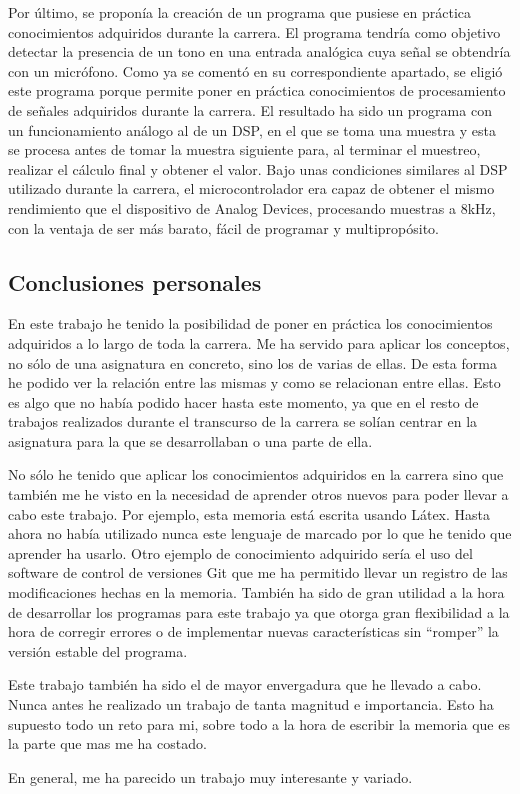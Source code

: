 Por último, se proponía la creación de un programa que pusiese en práctica conocimientos adquiridos durante la carrera. El programa tendría como objetivo detectar la presencia de un tono en una entrada analógica cuya señal se obtendría con un micrófono. Como ya se comentó en su correspondiente apartado, se eligió este programa porque permite poner en práctica conocimientos de procesamiento de señales adquiridos durante la carrera. El resultado ha sido un programa con un funcionamiento análogo al de un DSP, en el que se toma una muestra y esta se procesa antes de tomar la muestra siguiente para, al terminar el muestreo, realizar el cálculo final y obtener el valor. Bajo unas condiciones similares al DSP utilizado durante la carrera, el microcontrolador era capaz de obtener el mismo rendimiento que el dispositivo de Analog Devices, procesando muestras a 8kHz, con la ventaja de ser más barato, fácil de programar y multipropósito.

\subsection{Conclusiones personales}
En este trabajo he tenido la posibilidad de poner en práctica los conocimientos adquiridos a lo largo de toda la carrera. Me ha servido para aplicar los conceptos, no sólo de una asignatura en concreto, sino los de varias de ellas. De esta forma he podido ver la relación entre las mismas y como se relacionan entre ellas. Esto es algo que no había podido hacer hasta este momento, ya que en el resto de trabajos realizados durante el transcurso de la carrera se solían centrar en la asignatura para la que se desarrollaban o una parte de ella.

No sólo he tenido que aplicar los conocimientos adquiridos en la carrera sino que también me he visto en la necesidad de aprender otros nuevos para poder llevar a cabo este trabajo. Por ejemplo, esta memoria está escrita usando Látex. Hasta ahora no había utilizado nunca este lenguaje de marcado por lo que he tenido que aprender ha usarlo. Otro ejemplo de conocimiento adquirido sería el uso del software de control de versiones Git que me ha permitido llevar un registro de las modificaciones hechas en la memoria. También ha sido de gran utilidad a la hora de desarrollar los programas para este trabajo ya que otorga gran flexibilidad a la hora de corregir errores o de implementar nuevas características sin “romper” la versión estable del programa.

Este trabajo también ha sido el de mayor envergadura que he llevado a cabo. Nunca antes he realizado un trabajo de tanta magnitud e importancia. Esto ha supuesto todo un reto para mi, sobre todo a la hora de escribir la memoria que es la parte que mas me ha costado.

En general, me ha parecido un trabajo muy interesante y variado.


